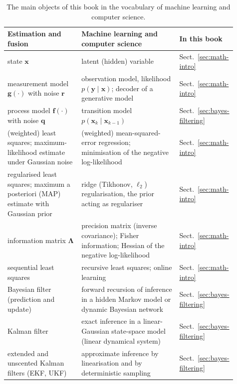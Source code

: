 \documentclass[graybox,envcountchap]{style/SNmono}
\begin{document}
\begin{table}[!t]
    \centering
    \footnotesize
    \setlength{\tabcolsep}{4pt}
    \renewcommand{\arraystretch}{1.3}
    \caption{The main objects of this book in the vocabulary of machine learning and computer science.}
    \label{tab:ml-dictionary}
    \begin{tabular}{>{\raggedright\arraybackslash}p{0.33\linewidth} >{\raggedright\arraybackslash}p{0.44\linewidth} >{\raggedright\arraybackslash}p{0.14\linewidth}}
        \hline
        \textbf{Estimation and fusion} & \textbf{Machine learning and computer science} & \textbf{In this book} \\
        \hline
        state $\mathbf{x}$ & latent (hidden) variable & Sect.~\ref{sec:math-intro} \\
        measurement model $\mathbf{g}(\cdot)$ with noise $\mathbf{r}$ & observation model, likelihood $p(\mathbf{y}\mid\mathbf{x})$; decoder of a generative model & Sect.~\ref{sec:math-intro} \\
        process model $\mathbf{f}(\cdot)$ with noise $\mathbf{q}$ & transition model $p(\mathbf{x}_k\mid\mathbf{x}_{k-1})$ & Sect.~\ref{sec:bayes-filtering} \\
        (weighted) least squares; maximum-likelihood estimate under Gaussian noise & (weighted) mean-squared-error regression; minimisation of the negative log-likelihood & Sect.~\ref{sec:math-intro} \\
        regularised least squares; maximum a posteriori (MAP) estimate with Gaussian prior & ridge (Tikhonov, $\ell_2$) regularisation, the prior acting as regulariser & Sect.~\ref{sec:math-intro} \\
        information matrix $\mathbf{\Lambda}$ & precision matrix (inverse covariance); Fisher information; Hessian of the negative log-likelihood & Sect.~\ref{sec:math-intro} \\
        sequential least squares & recursive least squares; online learning & Sect.~\ref{sec:math-intro} \\
        Bayesian filter (prediction and update) & forward recursion of inference in a hidden Markov model or dynamic Bayesian network & Sect.~\ref{sec:bayes-filtering} \\
        Kalman filter & exact inference in a linear-Gaussian state-space model (linear dynamical system) & Sect.~\ref{sec:bayes-filtering} \\
       extended and unscented Kalman filters (EKF, UKF) & approximate inference by linearisation and by deterministic sampling & Sect.~\ref{sec:bayes-filtering} \\

\end{tabular}
\end{table}
\end{document}
